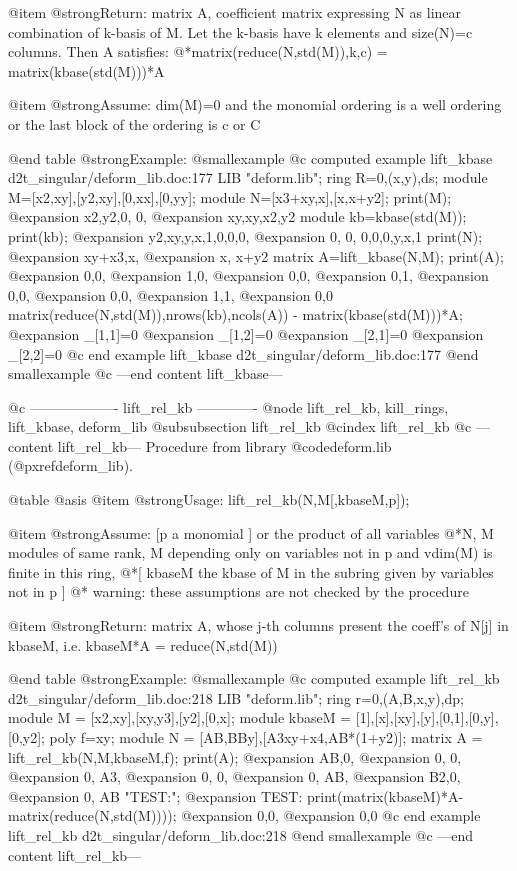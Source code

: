 @item @strong{Return:}
matrix A, coefficient matrix expressing N as linear combination of
k-basis of M. Let the k-basis have k elements and size(N)=c columns.
Then A satisfies:
@*matrix(reduce(N,std(M)),k,c) = matrix(kbase(std(M)))*A

@item @strong{Assume:}
dim(M)=0 and the monomial ordering is a well ordering or the last
block of the ordering is c or C

@end table
@strong{Example:}
@smallexample
@c computed example lift_kbase d2t_singular/deform_lib.doc:177 
LIB "deform.lib";
ring R=0,(x,y),ds;
module M=[x2,xy],[y2,xy],[0,xx],[0,yy];
module N=[x3+xy,x],[x,x+y2];
print(M);
@expansion{} x2,y2,0, 0,
@expansion{} xy,xy,x2,y2
module kb=kbase(std(M));
print(kb);
@expansion{} y2,xy,y,x,1,0,0,0,
@expansion{} 0, 0, 0,0,0,y,x,1 
print(N);
@expansion{} xy+x3,x,  
@expansion{} x,    x+y2
matrix A=lift_kbase(N,M);
print(A);
@expansion{} 0,0,
@expansion{} 1,0,
@expansion{} 0,0,
@expansion{} 0,1,
@expansion{} 0,0,
@expansion{} 0,0,
@expansion{} 1,1,
@expansion{} 0,0 
matrix(reduce(N,std(M)),nrows(kb),ncols(A)) - matrix(kbase(std(M)))*A;
@expansion{} _[1,1]=0
@expansion{} _[1,2]=0
@expansion{} _[2,1]=0
@expansion{} _[2,2]=0
@c end example lift_kbase d2t_singular/deform_lib.doc:177
@end smallexample
@c ---end content lift_kbase---

@c ------------------- lift_rel_kb -------------
@node lift_rel_kb, kill_rings, lift_kbase, deform_lib
@subsubsection lift_rel_kb
@cindex lift_rel_kb
@c ---content lift_rel_kb---
Procedure from library @code{deform.lib} (@pxref{deform_lib}).

@table @asis
@item @strong{Usage:}
lift_rel_kb(N,M[,kbaseM,p]);

@item @strong{Assume:}
[p a monomial ] or the product of all variables
@*N, M modules of same rank, M depending only on variables not in p
and vdim(M) is finite in this ring,
@*[ kbaseM the kbase of M in the subring given by variables not in p ] @*
warning: these assumptions are not checked by the procedure

@item @strong{Return:}
matrix A, whose j-th columns present the coeff's of N[j] in kbaseM,
i.e. kbaseM*A = reduce(N,std(M))

@end table
@strong{Example:}
@smallexample
@c computed example lift_rel_kb d2t_singular/deform_lib.doc:218 
LIB "deform.lib";
ring r=0,(A,B,x,y),dp;
module M      = [x2,xy],[xy,y3],[y2],[0,x];
module kbaseM = [1],[x],[xy],[y],[0,1],[0,y],[0,y2];
poly f=xy;
module N = [AB,BBy],[A3xy+x4,AB*(1+y2)];
matrix A = lift_rel_kb(N,M,kbaseM,f);
print(A);
@expansion{} AB,0, 
@expansion{} 0, 0, 
@expansion{} 0, A3,
@expansion{} 0, 0, 
@expansion{} 0, AB,
@expansion{} B2,0, 
@expansion{} 0, AB 
"TEST:";
@expansion{} TEST:
print(matrix(kbaseM)*A-matrix(reduce(N,std(M))));
@expansion{} 0,0,
@expansion{} 0,0 
@c end example lift_rel_kb d2t_singular/deform_lib.doc:218
@end smallexample
@c ---end content lift_rel_kb---

